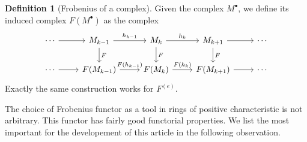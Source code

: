 \documentclass[leqno]{article}
\theoremstyle{definition}
\newtheorem{definition}{Definition}[section]
\begin{document}
\begin{definition}[Frobenius of a complex] Given the complex $M^{\bullet}$, we define its induced complex $F(M^{\bullet})$ as the complex
\[\begin{tikzcd}
	\cdots & {M_{k-1}} & {M_{k}} & {M_{k+1}} & \cdots \\
	\cdots & {F(M_{k-1})} & {F(M_{k})} & {F(M_{k+1})} & \cdots
	\arrow["F", from=1-2, to=2-2]
	\arrow["F", from=1-3, to=2-3]
	\arrow["F", from=1-4, to=2-4]
	\arrow["{h_{k-1}}", from=1-2, to=1-3]
	\arrow["{h_k}", from=1-3, to=1-4]
	\arrow["{F(h_{k-1})}", from=2-2, to=2-3]
	\arrow["{F(h_k)}", from=2-3, to=2-4]
	\arrow[from=1-1, to=1-2]
	\arrow[from=1-4, to=1-5]
	\arrow[from=2-4, to=2-5]
	\arrow[from=2-1, to=2-2]
\end{tikzcd}\]
Exactly the same construction works for $F ^{(e)}$.
\end{definition}

The choice of Frobenius functor as a tool in rings of positive characteristic is not arbitrary. This functor has fairly good functorial properties. We list the most important for the developement of this article in the following observation.
\end{document}
